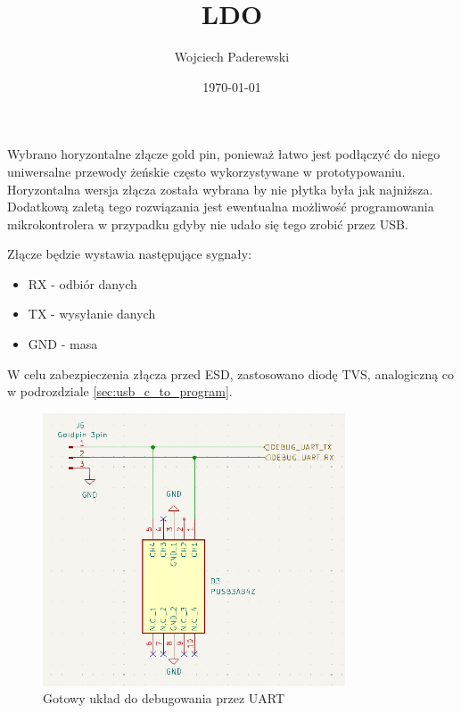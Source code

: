 \documentclass[../../main.tex]{subfiles}
\author{Wojciech Paderewski}
\date{\today}
\title{LDO}
\begin{document}
Wybrano horyzontalne złącze gold pin, ponieważ łatwo jest podłączyć do niego uniwersalne przewody żeńskie często wykorzystywane w prototypowaniu.
Horyzontalna wersja złącza została wybrana by nie płytka była jak najniższa. Dodatkową zaletą tego rozwiązania jest ewentualna możliwość programowania
mikrokontrolera w przypadku gdyby nie udało się tego zrobić przez USB. 

Złącze będzie wystawia następujące sygnały:
\begin{itemize}
    \item RX - odbiór danych
    \item TX - wysyłanie danych
    \item GND - masa
\end{itemize}

W celu zabezpieczenia złącza przed ESD, zastosowano diodę TVS, analogiczną co w podrozdziale \ref{sec:usb_c_to_program}.

\begin{figure}[H]
    \centering
    \includegraphics[width=0.8\textwidth]{uart.png}
    \caption{Gotowy układ do debugowania przez UART}
\end{figure}
\end{document}
